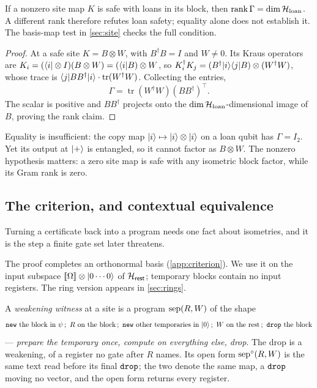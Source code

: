 \documentclass[acmsmall,screen,review,anonymous,nonacm]{acmart}
\begin{document}
\begin{proposition}\label{prop:loangram}
If a nonzero site map $K$ is safe with loans in its block, then
$\operatorname{rank}\Gamma=\dim\mathcal{H}_{\mathrm{loan}}$. A different rank therefore refutes loan safety; equality alone does not
establish it. The basis-map test in \cref{sec:site} checks the full condition.
\end{proposition}
\begin{proof}
At a safe site $K=B\otimes W$, with $B^{\dagger}B=I$ and $W\ne0$.
Its Kraus operators are $K_i=(\langle i \rvert \otimes I)(B \otimes W) = (\langle i \rvert B)
\otimes W$, so $K_i^{\dagger}K_j = (B^{\dagger}\lvert i \rangle\langle j \rvert B) \otimes
(W^{\dagger}W)$, whose trace is
$\langle j \rvert BB^{\dagger}\lvert i \rangle \cdot \operatorname{tr}(W^{\dagger}W)$.
Collecting the entries,
\[
 \Gamma=\operatorname{tr}(W^{\dagger}W)(BB^{\dagger})^{\top}.
\]
The scalar is positive and $BB^{\dagger}$ projects onto the
$\dim\mathcal{H}_{\mathrm{loan}}$-dimensional image of $B$, proving the rank claim.
\end{proof}
Equality is insufficient: the copy map $\lvert i \rangle\mapsto\lvert i \rangle\otimes\lvert i \rangle$
on a loan qubit has $\Gamma=I_2$. Yet its output at $\lvert + \rangle$ is entangled,
so it cannot factor as $B\otimes W$.
The nonzero hypothesis matters: a zero site map is safe with any
isometric block factor, while its Gram rank is zero.

\subsection{The criterion, and contextual equivalence}\label{sec:ctxequiv}

Turning a certificate back into a program needs one fact about isometries,
and it is the step a finite gate set later threatens.

\stmtIsoExt

The proof completes an orthonormal basis (\cref{app:criterion}). We use
it on the input subspace $[\![\Omega]\!]\otimes\lvert 0\cdots0 \rangle$ of $\mathcal{H}_{\mathsf{rest}}$;
temporary blocks contain no input registers. The ring version appears in
\cref{sec:rings}.

\begin{definition}\label{def:sw}
A \emph{weakening witness} at a site is a program $\mathrm{sep}(R,W)$ of the shape
\[
  \texttt{new}\ \text{the block in } \psi\,;\ R\ \text{on the block}\,;\
  \texttt{new}\ \text{other temporaries in } \lvert 0 \rangle\,;\ W\ \text{on the rest}\,;\
  \texttt{drop}\ \text{the block}
\]
--- \emph{prepare the temporary once, compute on everything else, drop}. The drop is a weakening, of a register no gate after $R$ names.
Its open form $\mathrm{sep}^{\circ}(R,W)$ is the same text read before its
final $\texttt{drop}$; the two denote the same map, a $\texttt{drop}$ moving no vector, and
the open form returns every register.
\end{definition}
\end{document}

